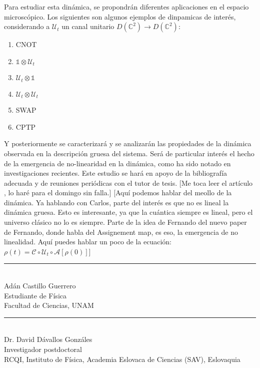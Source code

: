 \documentclass[onecolumn,11pt]{article}
\newcommand{\mcU}{\mathcal{U}}
\newcommand{\mcC}{\mathcal{C}}
\newcommand{\mcA}{\mathcal{A}}
\newcommand{\Hh}{\mathbb{C}} %
\newcommand{\Id}{\mathds{1}}%
\newcommand{\nota}[1]{{\color{red} [#1]}}
\newcommand{\notaAd}[1]{{\color{blue} [#1]}} %
\begin{document}
Para estudiar esta dinámica, se propondrán diferentes aplicaciones en el espacio microscópico. Los siguientes son algunos ejemplos de dinpamicas de interés, considerando a $\mcU_{t}$ un canal unitario $D(\Hh^{2})\rightarrow D(\Hh^{2})$:
    \begin{multicols}{3}
    \begin{enumerate}
        \item \textsc{CNOT}
        \item $\Id\otimes \mcU_{t}$
        \item $\mcU_{t}\otimes\Id$
        \item $\mcU_{t}\otimes \mcU_{t}$
        \item \textsc{SWAP}
        \item \textsc{CPTP}
    \end{enumerate}
    \end{multicols}
Y posteriormente se caracterizará y se analizarán las propiedades de la dinámica observada en la descripción gruesa del sistema. Será de particular interés el hecho de la emergencia de no-linearidad en la dinámica, como ha sido notado en investigaciones recientes\cite{Macro-To-Micro}\cite{CGEmergingDynamics}. Este estudio se hará en apoyo de la bibliografía adecuada y de reuniones periódicas con el tutor de tesis. \notaAd{Me toca leer el artículo \cite{BeyondKraus}, lo haré para el domingo sin falla.}
\nota{Aquí podemos hablar del meollo de la dinámica. Ya hablando con Carlos, parte del interés es que no es lineal la dinámica gruesa. Esto es interesante, ya que la cuántica siempre es lineal, pero el universo clásico no lo es siempre. Parte de la idea de Fernando del nuevo paper de Fernando, donde habla del Assignement map, es eso, la emergencia de no linealidad. Aquí puedes hablar un poco de la ecuación: $\rho(t)=\mcC \circ \mcU_t \circ \mcA [\rho(0)]$}


\begin{center}
    \rule{200pt}{0.4pt}\\
    Adán Castillo Guerrero \\
    Estudiante de Física \\
    Facultad de Ciencias, UNAM \\
    
\end{center}

\vspace{1.0cm}

\begin{center}
    \rule{200pt}{0.4pt}\\
    Dr. David Dávallos Gonzáles \\
    Investigador postdoctoral \\
    RCQI, Instituto de Física, Academia Eslovaca de Ciencias (SAV), Eslovaquia\\
    
\end{center}


\end{document}
